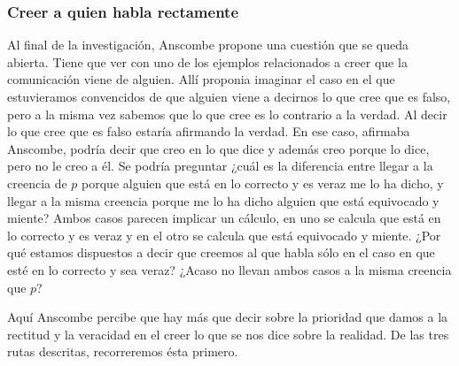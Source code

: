 \subsubsection{Creer a quien habla rectamente}
Al final de la investigación, Anscombe propone una cuestión que se queda
abierta. Tiene que ver con uno de los ejemplos relacionados a creer que la
comunicación viene de alguien. Allí proponia imaginar el caso en el que
estuvieramos convencidos de que alguien viene a decirnos lo que cree que es
falso, pero a la misma vez sabemos que lo que cree es lo contrario a la verdad.
Al decir lo que cree que es falso estaría afirmando la verdad. En ese caso,
afirmaba Anscombe, podría decir que creo en lo que dice y además creo porque lo
dice, pero no le creo a él. Se podría preguntar ¿cuál es la diferencia entre
llegar a la creencia de $p$ porque alguien que está en lo correcto y es veraz me
lo ha dicho, y llegar a la misma creencia porque me lo ha dicho alguien que está
equivocado y miente? Ambos casos parecen implicar un cálculo, en uno se calcula
que está en lo correcto y es veraz y en el otro se calcula que está equivocado y
miente. ¿Por qué estamos dispuestos a decir que creemos al que habla sólo en el
caso en que esté en lo correcto y sea veraz? ¿Acaso no llevan ambos casos a la
misma creencia que $p$?

Aquí Anscombe percibe que hay más que decir sobre la prioridad que damos a la
rectitud y la veracidad en el creer lo que se nos dice sobre la realidad. De las
tres rutas descritas, recorreremos ésta primero.
